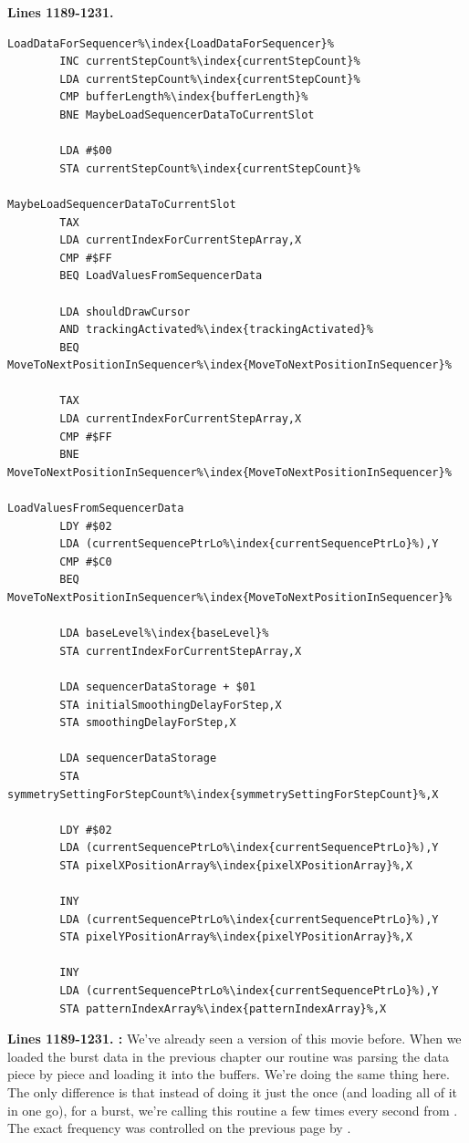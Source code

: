 \clearpage
\textbf{Lines 1189-1231. }
\begin{lstlisting}[escapechar=\%]
LoadDataForSequencer%\index{LoadDataForSequencer}%   
        INC currentStepCount%\index{currentStepCount}%
        LDA currentStepCount%\index{currentStepCount}%
        CMP bufferLength%\index{bufferLength}%
        BNE MaybeLoadSequencerDataToCurrentSlot

        LDA #$00
        STA currentStepCount%\index{currentStepCount}%

MaybeLoadSequencerDataToCurrentSlot   
        TAX 
        LDA currentIndexForCurrentStepArray,X
        CMP #$FF
        BEQ LoadValuesFromSequencerData

        LDA shouldDrawCursor
        AND trackingActivated%\index{trackingActivated}%
        BEQ MoveToNextPositionInSequencer%\index{MoveToNextPositionInSequencer}%

        TAX 
        LDA currentIndexForCurrentStepArray,X
        CMP #$FF
        BNE MoveToNextPositionInSequencer%\index{MoveToNextPositionInSequencer}%

LoadValuesFromSequencerData   
        LDY #$02
        LDA (currentSequencePtrLo%\index{currentSequencePtrLo}%),Y
        CMP #$C0
        BEQ MoveToNextPositionInSequencer%\index{MoveToNextPositionInSequencer}%

        LDA baseLevel%\index{baseLevel}%
        STA currentIndexForCurrentStepArray,X

        LDA sequencerDataStorage + $01
        STA initialSmoothingDelayForStep,X
        STA smoothingDelayForStep,X

        LDA sequencerDataStorage
        STA symmetrySettingForStepCount%\index{symmetrySettingForStepCount}%,X

        LDY #$02
        LDA (currentSequencePtrLo%\index{currentSequencePtrLo}%),Y
        STA pixelXPositionArray%\index{pixelXPositionArray}%,X

        INY 
        LDA (currentSequencePtrLo%\index{currentSequencePtrLo}%),Y
        STA pixelYPositionArray%\index{pixelYPositionArray}%,X

        INY 
        LDA (currentSequencePtrLo%\index{currentSequencePtrLo}%),Y
        STA patternIndexArray%\index{patternIndexArray}%,X

\end{lstlisting}

\clearpage

\textbf{Lines 1189-1231. :} We've already seen a version of this movie before. When we loaded the burst data in the previous chapter
our routine was parsing the data piece by piece and loading it into the buffers. We're doing the same thing here. The only difference is that instead of doing it just
the once (and loading all of it in one go), for a burst, we're calling this routine a few times every second from . The exact frequency was controlled on the previous page
by . 

